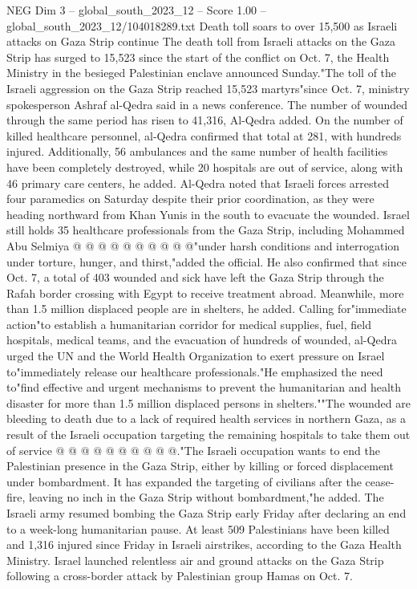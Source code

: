 \begin{textsample}{NEG Dim 3 – global\_south\_2023\_12 – Score 1.00 – global\_south\_2023\_12/104018289.txt}  \label{ex:f3_neg_019}
Death toll soars to over 15,500 as Israeli attacks on Gaza Strip continue The death toll from Israeli attacks on the Gaza Strip has surged to 15,523 since the start of the conflict on Oct. 7, the Health Ministry in the besieged Palestinian enclave announced Sunday."The toll of the Israeli aggression on the Gaza Strip reached 15,523 martyrs"since Oct. 7, ministry spokesperson Ashraf al-Qedra said in a news conference.
The number of wounded through the same period has risen to 41,316, Al-Qedra added.
On the number of killed healthcare personnel, al-Qedra confirmed that total at 281, with hundreds injured.
Additionally, 56 ambulances and the same number of health facilities have been completely destroyed, while 20 hospitals are out of service, along with 46 primary care centers, he added.
Al-Qedra noted that Israeli forces arrested four paramedics on Saturday despite their prior coordination, as they were heading northward from Khan Yunis in the south to evacuate the wounded.
Israel still holds 35 healthcare professionals from the Gaza Strip, including Mohammed Abu Selmiya @ @ @ @ @ @ @ @ @ @"under harsh conditions and interrogation under torture, hunger, and thirst,"added the official.
He also confirmed that since Oct. 7, a total of 403 wounded and sick have left the Gaza Strip through the Rafah border crossing with Egypt to receive treatment abroad.
Meanwhile, more than 1.5 million displaced people are in shelters, he added.
Calling for"immediate action"to establish a humanitarian corridor for medical supplies, fuel, field hospitals, medical teams, and the evacuation of hundreds of wounded, al-Qedra urged the UN and the World Health Organization to exert pressure on Israel to"immediately release our healthcare professionals."He emphasized the need to"find effective and urgent mechanisms to prevent the humanitarian and health disaster for more than 1.5 million displaced persons in shelters.""The wounded are bleeding to death due to a lack of required health services in northern Gaza, as a result of the Israeli occupation targeting the remaining hospitals to take them out of service @ @ @ @ @ @ @ @ @ @."The Israeli occupation wants to end the Palestinian presence in the Gaza Strip, either by killing or forced displacement under bombardment.
It has expanded the targeting of civilians after the cease-fire, leaving no inch in the Gaza Strip without bombardment,"he added.
The Israeli army resumed bombing the Gaza Strip early Friday after declaring an end to a week-long humanitarian pause.
At least 509 Palestinians have been killed and 1,316 injured since Friday in Israeli airstrikes, according to the Gaza Health Ministry.
Israel launched relentless air and ground attacks on the Gaza Strip following a cross-border attack by Palestinian group Hamas on Oct. 7.

\end{textsample}
